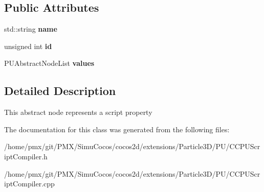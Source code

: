 \subsection*{Public Attributes}
\begin{DoxyCompactItemize}
\item 
\mbox{\label{classPUPropertyAbstractNode_af913476ede8e50fbfe7544e16f37a733}} 
std\+::string {\bfseries name}
\item 
\mbox{\label{classPUPropertyAbstractNode_a11fe3be0118608a7c31409cf360e4bfd}} 
unsigned int {\bfseries id}
\item 
\mbox{\label{classPUPropertyAbstractNode_a10a7f3917a8a0fcb50da9c577729d198}} 
P\+U\+Abstract\+Node\+List {\bfseries values}
\end{DoxyCompactItemize}


\subsection{Detailed Description}
This abstract node represents a script property 

The documentation for this class was generated from the following files\+:\begin{DoxyCompactItemize}
\item 
/home/pmx/git/\+P\+M\+X/\+Simu\+Cocos/cocos2d/extensions/\+Particle3\+D/\+P\+U/C\+C\+P\+U\+Script\+Compiler.\+h\item 
/home/pmx/git/\+P\+M\+X/\+Simu\+Cocos/cocos2d/extensions/\+Particle3\+D/\+P\+U/C\+C\+P\+U\+Script\+Compiler.\+cpp\end{DoxyCompactItemize}
